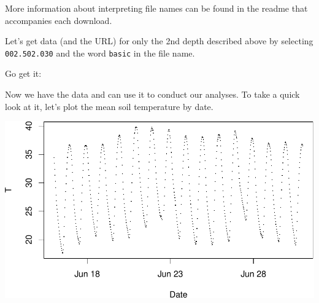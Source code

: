 \documentclass[]{book}
\newenvironment{Shaded}{\begin{snugshade}}{\end{snugshade}}
\newcommand{\CommentTok}[1]{\textcolor[rgb]{0.56,0.35,0.01}{\textit{#1}}}
\newcommand{\DataTypeTok}[1]{\textcolor[rgb]{0.13,0.29,0.53}{#1}}
\newcommand{\KeywordTok}[1]{\textcolor[rgb]{0.13,0.29,0.53}{\textbf{#1}}}
\newcommand{\NormalTok}[1]{#1}
\newcommand{\OperatorTok}[1]{\textcolor[rgb]{0.81,0.36,0.00}{\textbf{#1}}}
\newcommand{\StringTok}[1]{\textcolor[rgb]{0.31,0.60,0.02}{#1}}
\begin{document}
More information about interpreting file names can be found in the readme that
accompanies each download.

Let's get data (and the URL) for only the 2nd depth described above by selecting
\texttt{002.502.030} and the word \texttt{basic} in the file name.

Go get it:

\begin{Shaded}
\end{Shaded}

Now we have the data and can use it to conduct our analyses. To take
a quick look at it, let's plot the mean soil temperature by date.

\begin{Shaded}
\end{Shaded}

\includegraphics{_main_files/figure-latex/os-plot-soil-data-1.pdf}
\end{document}
